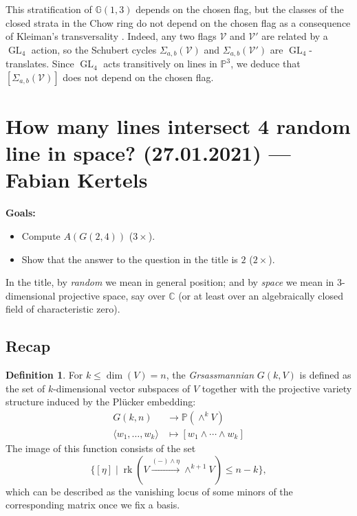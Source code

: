 \documentclass[12pt,a4paper]{amsart}
\theoremstyle{plain}
\theoremstyle{definition}
\newtheorem{defn}[thm]{Definition}
\theoremstyle{remark}
\begin{document}
This stratification of $\mathbb{G}(1,3)$ depends on the chosen flag, but the classes of the closed strata in the Chow ring do not depend on the chosen flag as a consequence of Kleiman's transversality \cite[Theorem 1.7]{eh16}.
Indeed, any two flags $\mathcal{V}$ and $\mathcal{V}'$ are related by a $\operatorname{GL}_{4}$ action, so the Schubert cycles $\Sigma_{a,b}(\mathcal{V})$ and $\Sigma_{a,b}(\mathcal{V}')$ are $\operatorname{GL}_{4}$-translates.
Since $\operatorname{GL}_{4}$ acts transitively on lines in $\mathbb{P}^{3}$, we deduce that $[\Sigma_{a,b}(\mathcal{V})]$ does not depend on the chosen flag.

\section{How many lines intersect 4 random line in space? (27.01.2021) --- Fabian Kertels}

\textbf{Goals:}
\begin{itemize}
    \item Compute $A(G(2,4))$ ($3\times $).
    \item Show that the answer to the question in the title is $2$ ($2\times $).
\end{itemize}

In the title, by \textit{random} we mean in general position; and by \textit{space} we mean in $3$-dimensional projective space, say over $\mathbb{C}$ (or at least over an algebraically closed field of characteristic zero).

\subsection{Recap}

\begin{defn}
    For $k\leq \dim(V)=n$, the \textit{Grsassmannian} $G(k,V)$ is defined as the set of $k$-dimensional vector subspaces of $V$ together with the projective variety structure induced by the Pl\"{u}cker embedding:
    \begin{align*}
	G(k,n) & \longrightarrow \mathbb{P}(\wedge^{k} V) \\
	\langle w_{1},\ldots,w_{k}\rangle & \longmapsto [w_{1}\wedge \cdots \wedge w_{k}]
    \end{align*}
    The image of this function consists of the set
    \[ \{[\eta]\mid \operatorname{rk}(V\xrightarrow{(-)\wedge\eta}\wedge^{k+1}V)\leq n-k\}, \]
    which can be described as the vanishing locus of some minors of the corresponding matrix once we fix a basis.
\end{defn}
\end{document}
